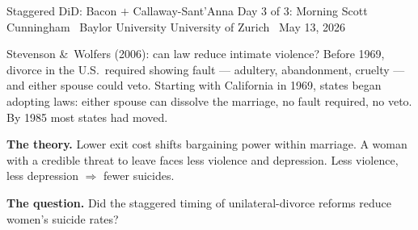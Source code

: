 \documentclass[aspectratio=169,11pt]{beamer}
\begin{document}

\remixtitleframe
  {Staggered DiD: Bacon $+$ Callaway-Sant'Anna}
  {Day 3 of 3: Morning}
  {Scott Cunningham \textperiodcentered\ Baylor University}
  {University of Zurich \textperiodcentered\ May 13, 2026}

\begin{frame}{Stevenson \&\ Wolfers (2006): can law reduce intimate violence?}
\vspace{0.4em}
Before 1969, divorce in the U.S.\ required showing fault --- adultery, abandonment, cruelty --- and either spouse could veto. \;Starting with California in 1969, states began adopting  laws: either spouse can dissolve the marriage, no fault required, no veto. \;By 1985 most states had moved.

\vspace{0.6em}
\textbf{The theory.} \;Lower exit cost shifts bargaining power within marriage. \;A woman with a credible threat to leave faces less violence and depression. \;Less violence, less depression $\Rightarrow$ fewer suicides.

\vspace{0.6em}
\textbf{The question.} \;Did the staggered timing of unilateral-divorce reforms reduce women's suicide rates?

\vspace{0.4em}
\end{frame}
\end{document}
